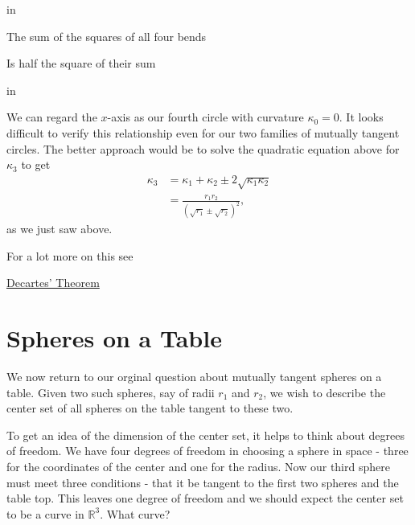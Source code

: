 \documentclass{ximera}
\newcommand{\pskip}{\vskip 0.1 in}
\begin{document}
\pskip

The sum of the squares of all four bends 

Is half the square of their sum

\pskip

We can regard the $x$-axis as our fourth circle with curvature $\kappa_0 = 0$. It looks difficult to verify this relationship even for our two families of mutually tangent circles. The better approach would be to solve the quadratic equation above for $\kappa_3$ to get
\begin{align*}
   \kappa_3   &= \kappa_1 + \kappa_2 \pm 2\sqrt{\kappa_1\kappa_2}  \\
                   &= \frac{r_1 r_2}{(\sqrt{r_1} \pm\sqrt{r_2})^2} ,
\end{align*}
as we just saw above.

For a lot more on this see

\href{https://en.wikipedia.org/wiki/Descartes%27_theorem}{Decartes' Theorem}


\section{Spheres on a Table}
We now return to our orginal question about mutually tangent spheres on a table. Given two such spheres, say of radii $r_1$ and $r_2$, we wish to describe the center set of all spheres on the table tangent to these two. 

To get an idea of the dimension of the center set, it helps to think about degrees of freedom. We have four degrees of freedom in choosing a sphere in space - three for the coordinates of the center and one for the radius. Now our third sphere must meet three conditions - that it be tangent to the first two spheres and the table top. This leaves one degree of freedom and we should expect the center set to be a curve in $\mathbb{R}^3$. What curve?
\end{document}
